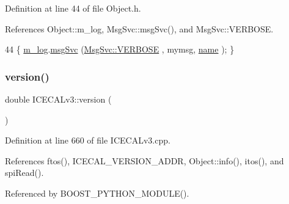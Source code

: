 Definition at line 44 of file Object.\+h.



References Object\+::m\+\_\+log, Msg\+Svc\+::msg\+Svc(), and Msg\+Svc\+::\+V\+E\+R\+B\+O\+SE.


\begin{DoxyCode}
44 \{ \hyperlink{classObject_a0d269813dd7ac1f24bc143031e2963f2}{m\_log}.\hyperlink{classMsgSvc_ad25f18047920cc59a314e5098259711c}{msgSvc} (\hyperlink{classMsgSvc_ae671eb7301996cd049d2da8a65925926af655256b06494ade5ba830abe5401ec9}{MsgSvc::VERBOSE} , mymsg, \hyperlink{classObject_a300f4c05dd468c7bb8b3c968868443c1}{name} ); \}
\end{DoxyCode}
\mbox{\label{classICECALv3_a7f3f8012d2e5c45f8e43819befa3f915}} 
\subsubsection{\texorpdfstring{version()}{version()}}
{\footnotesize\ttfamily double I\+C\+E\+C\+A\+Lv3\+::version (\begin{DoxyParamCaption}{ }\end{DoxyParamCaption})}



Definition at line 660 of file I\+C\+E\+C\+A\+Lv3.\+cpp.



References ftos(), I\+C\+E\+C\+A\+L\+\_\+\+V\+E\+R\+S\+I\+O\+N\+\_\+\+A\+D\+DR, Object\+::info(), itos(), and spi\+Read().



Referenced by B\+O\+O\+S\+T\+\_\+\+P\+Y\+T\+H\+O\+N\+\_\+\+M\+O\+D\+U\+L\+E().


